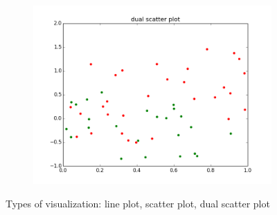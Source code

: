\begin{figure}
\begin{subfigure}{.3\textwidth}
  \includegraphics[width=\textwidth]{scatter_dual_plot.png}
\end{subfigure}
\caption{Types of visualization: line plot, scatter plot, dual scatter plot}
\label{fig:visTypes1}
\end{figure}
